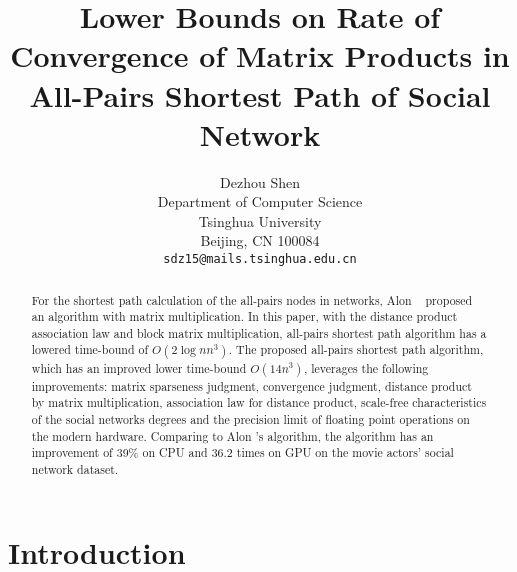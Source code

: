 \documentclass[review]{cvpr}
\begin{document}
\title{Lower Bounds on Rate of Convergence of Matrix Products in All-Pairs Shortest Path of Social Network}

\author{Dezhou Shen\\
Department of Computer Science\\
Tsinghua University\\
Beijing, CN 100084\\
{\tt\small sdz15@mails.tsinghua.edu.cn}
}

\maketitle


\begin{abstract}
  For the shortest path calculation of the all-pairs nodes in networks, Alon \etal~\cite{alon1997exponent} proposed an algorithm with matrix multiplication.
  In this paper, with the distance product association law and block matrix multiplication, all-pairs shortest path algorithm has a lowered time-bound of \(O(2\log{n}n^3)\).
  The proposed all-pairs shortest path algorithm, which has an improved lower time-bound \(O(14n^3)\), leverages the following improvements:
  matrix sparseness judgment, convergence judgment, distance product by matrix multiplication, association law for distance product,
  scale-free characteristics of the social networks degrees and the precision limit of floating point operations on the modern hardware.
  Comparing to Alon \etal's algorithm, the algorithm has an improvement of 39\% on CPU and 36.2 times on GPU on the movie actors' social network dataset.
\end{abstract}

\section{Introduction}
\end{document}
